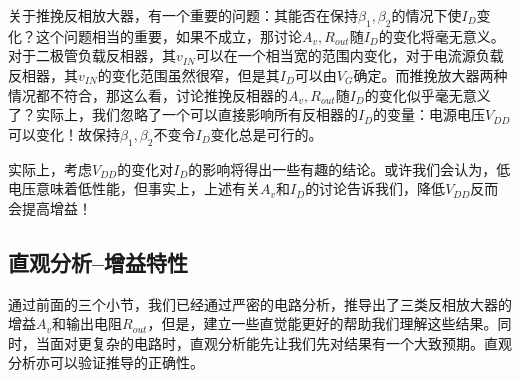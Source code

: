 关于推挽反相放大器，有一个重要的问题：其能否在保持$\beta_1,\beta_2$的情况下使$I_D$变化？这个问题相当的重要，如果不成立，那讨论$A_v,R_{out}$随$I_D$的变化将毫无意义。对于二极管负载反相器，其$v_{IN}$可以在一个相当宽的范围内变化，对于电流源负载反相器，其$v_{IN}$的变化范围虽然很窄，但是其$I_D$可以由$V_G$确定。而推挽放大器两种情况都不符合，那这么看，讨论推挽反相器的$A_v,R_{out}$随$I_D$的变化似乎毫无意义了？实际上，我们忽略了一个可以直接影响所有反相器的$I_D$的变量：电源电压$V_{DD}$可以变化！故保持$\beta_1,\beta_2$不变令$I_D$变化总是可行的。

实际上，考虑$V_{DD}$的变化对$I_D$的影响将得出一些有趣的结论。或许我们会认为，低电压意味着低性能，但事实上，上述有关$A_v$和$I_D$的讨论告诉我们，降低$V_{DD}$反而会提高增益！

\subsection{直观分析--增益特性}
通过前面的三个小节，我们已经通过严密的电路分析，推导出了三类反相放大器的增益$A_v$和输出电阻$R_{out}$，但是，建立一些直觉能更好的帮助我们理解这些结果。同时，当面对更复杂的电路时，直观分析能先让我们先对结果有一个大致预期。直观分析亦可以验证推导的正确性。

